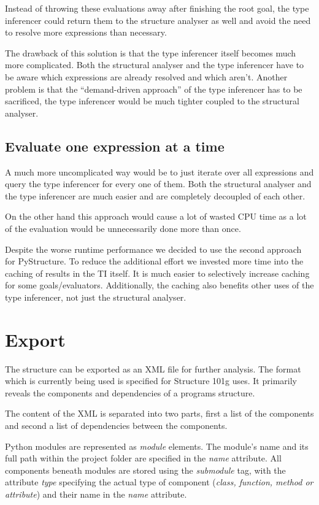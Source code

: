 \documentclass[12pt,halfparskip,DIV11,BCOR10mm]{scrreprt}
\begin{document}
Instead of throwing these evaluations away after finishing the root goal, the type inferencer could return them to the structure analyser as well and avoid the need to resolve more expressions than necessary.

The drawback of this solution is that the type inferencer itself becomes much more complicated. Both the structural analyser and the type inferencer have to be aware which expressions are already resolved and which aren't. Another problem is that the ``demand-driven approach'' of the type inferencer has to be sacrificed, the type inferencer would be much tighter coupled to the structural analyser.
\subsection{Evaluate one expression at a time}

A much more uncomplicated way would be to just iterate over all expressions and query the type inferencer for every one of them. Both the structural analyser and the type inferencer are much easier and are completely decoupled of each other.

On the other hand this approach would cause a lot of wasted CPU time as a lot of the evaluation would be unnecessarily done more than once.

Despite the worse runtime performance we decided to use the second approach for PyStructure. To reduce the additional effort we invested more time into the caching of results in the TI itself. It is much easier to selectively increase caching for some goals/evaluators. Additionally, the caching also benefits other uses of the type inferencer, not just the structural analyser.

\section{Export}

The structure can be exported as an XML file for further analysis. The format which is currently being used is specified for Structure 101g uses. It primarily reveals the components and dependencies of a programs structure. 

The content of the XML is separated into two parts, first a list of the components and second a list of dependencies between the components.


Python modules are represented as \emph{module} elements. The module's name and its full path within the project folder are specified in the \emph{name} attribute. All components beneath modules are stored using the \emph{submodule} tag, with the attribute \emph{type} specifying the actual type of component (\emph{class, function, method or attribute}) and their name in the \emph{name} attribute.
\end{document}
